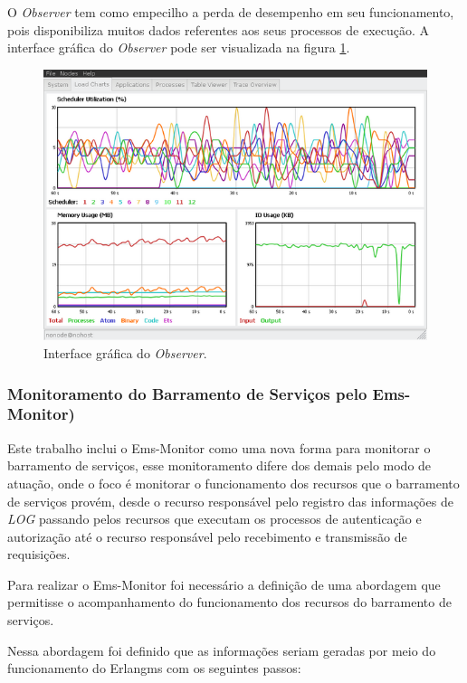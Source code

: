 O \textit{Observer} tem como empecilho a perda de desempenho em seu funcionamento, pois disponibiliza muitos dados referentes aos seus processos de execução. A interface gráfica do \textit{Observer} pode ser visualizada na figura \ref{fun:fig:observer}. 

\begin{figure}[H]
	\begin{center}
	\includegraphics[scale = 0.70]{img/observerGo.jpg}
		\caption{Interface gráfica do \textit{Observer}.}
		\label{fun:fig:observer}
	\end{center}
\end{figure}

\subsubsection{Monitoramento do Barramento de Serviços pelo Ems-Monitor)}

Este trabalho inclui o Ems-Monitor como uma nova forma para monitorar o barramento de serviços, esse monitoramento difere dos demais pelo modo de atuação, onde o foco é monitorar o funcionamento dos recursos que o barramento de serviços provém, desde o recurso responsável pelo registro das informações de \textit{LOG} passando pelos recursos que executam os processos de autenticação e autorização até o recurso responsável pelo recebimento e transmissão de requisições. 

Para realizar o Ems-Monitor foi necessário a definição de uma abordagem que permitisse o acompanhamento do funcionamento dos recursos do barramento de serviços. 

Nessa abordagem foi definido que as informações seriam geradas por meio do funcionamento do Erlangms com os seguintes passos:

